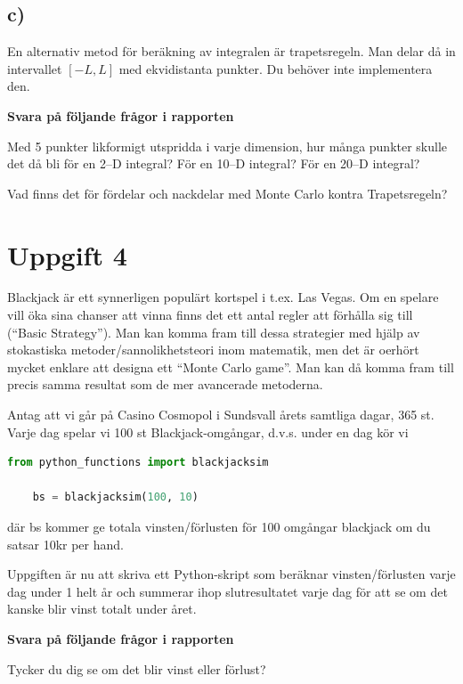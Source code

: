 \documentclass[a4paper]{article}
\begin{document}
\subsection{c)}
En alternativ metod för beräkning av integralen är trapetsregeln.
Man delar då in intervallet \([-L, L]\) med ekvidistanta punkter.
Du behöver inte implementera den.

\textbf{Svara på följande frågor i rapporten}

Med 5 punkter likformigt utspridda i varje dimension, hur många punkter skulle
det då bli för en 2--D integral? För en 10--D integral? För en 20--D integral?

Vad finns det för fördelar och nackdelar med Monte Carlo kontra Trapetsregeln?

\newpage
\section{Uppgift 4}

Blackjack är ett synnerligen populärt kortspel i t.ex. Las Vegas.
Om en spelare vill öka sina chanser att vinna finns det ett antal regler att
förhålla sig till (``Basic Strategy''). Man kan komma fram till dessa strategier
med hjälp av stokastiska metoder/sannolikhetsteori inom matematik, men det är oerhört
mycket enklare att designa ett ``Monte Carlo game''. Man kan då komma fram till precis
samma resultat som de mer avancerade metoderna.

Antag att vi går på Casino Cosmopol i Sundsvall årets samtliga dagar, 365 st.
Varje dag spelar vi 100 st Blackjack-omgångar, d.v.s. under en dag kör vi 
\begin{lstlisting}[language=Python]
    from python_functions import blackjacksim

    bs = blackjacksim(100, 10)
\end{lstlisting}
där bs kommer ge totala vinsten/förlusten för 100 omgångar blackjack om du satsar 10kr per hand.

Uppgiften är nu att skriva ett Python-skript som beräknar vinsten/förlusten varje dag under 1
helt år och summerar ihop slutresultatet varje dag för att se om det kanske blir vinst totalt under året.

\textbf{Svara på följande frågor i rapporten}

Tycker du dig se om det blir vinst eller förlust?
\end{document}
